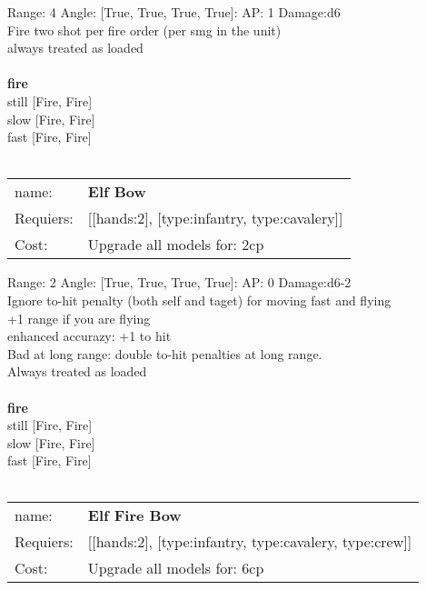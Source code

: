 Range: 4  Angle: [True, True, True, True]: AP: 1 Damage:d6 \\
Fire two shot per fire order (per smg in the unit)\\ 
always treated as loaded\\ 







\ \\ {\bf fire } \\
still [Fire, Fire] \\
slow [Fire, Fire] \\
fast [Fire, Fire] \\

\ \\
\begin{tabular}{ll}
name: & {\bf Elf Bow } \\
Requiers: & [[hands:2], [type:infantry, type:cavalery]] \\
Cost: & Upgrade all models for: 2cp \\
\end{tabular}



Range: 2  Angle: [True, True, True, True]: AP: 0 Damage:d6-2 \\
Ignore to-hit penalty (both self and taget) for moving fast and flying\\ 
+1 range if you are flying\\ 
enhanced accurazy: +1 to hit\\ 
Bad at long range: double to-hit penalties at long range.\\ 
Always treated as loaded\\ 







\ \\ {\bf fire } \\
still [Fire, Fire] \\
slow [Fire, Fire] \\
fast [Fire, Fire] \\

\ \\
\begin{tabular}{ll}
name: & {\bf Elf Fire Bow } \\
Requiers: & [[hands:2], [type:infantry, type:cavalery, type:crew]] \\
Cost: & Upgrade all models for: 6cp \\
\end{tabular}



